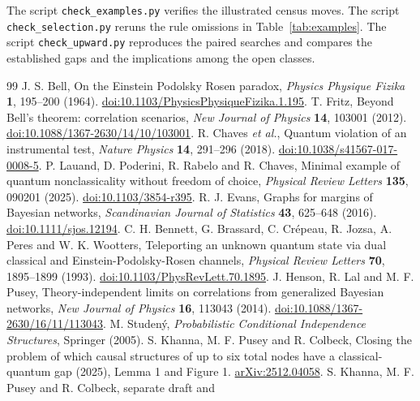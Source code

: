 The script \texttt{check\_examples.py} verifies the illustrated census
moves. The script \texttt{check\_selection.py} reruns the rule omissions in Table~\ref{tab:examples}. The script \texttt{check\_upward.py} reproduces the paired searches
and compares the established gaps and the implications among the open
classes.

\begin{thebibliography}{99}
 J. S. Bell, On the Einstein Podolsky Rosen paradox,
\emph{Physics Physique Fizika} \textbf{1}, 195--200 (1964).
\href{https://doi.org/10.1103/PhysicsPhysiqueFizika.1.195}{doi:10.1103/PhysicsPhysiqueFizika.1.195}.
 T. Fritz, Beyond Bell's theorem: correlation scenarios,
\emph{New Journal of Physics} \textbf{14}, 103001 (2012).
\href{https://doi.org/10.1088/1367-2630/14/10/103001}{doi:10.1088/1367-2630/14/10/103001}.
 R. Chaves \emph{et al.}, Quantum violation of an instrumental
test, \emph{Nature Physics} \textbf{14}, 291--296 (2018).
\href{https://doi.org/10.1038/s41567-017-0008-5}{doi:10.1038/s41567-017-0008-5}.
 P. Lauand, D. Poderini, R. Rabelo and R. Chaves, Minimal
example of quantum nonclassicality without freedom of choice, \emph{Physical
Review Letters} \textbf{135}, 090201 (2025).
\href{https://doi.org/10.1103/3854-r395}{doi:10.1103/3854-r395}.
 R. J. Evans, Graphs for margins of Bayesian networks,
\emph{Scandinavian Journal of Statistics} \textbf{43}, 625--648 (2016).
\href{https://doi.org/10.1111/sjos.12194}{doi:10.1111/sjos.12194}.
 C. H. Bennett, G. Brassard, C. Crépeau, R. Jozsa,
A. Peres and W. K. Wootters, Teleporting an unknown quantum state via dual
classical and Einstein-Podolsky-Rosen channels,
\emph{Physical Review Letters} \textbf{70}, 1895--1899 (1993).
\href{https://doi.org/10.1103/PhysRevLett.70.1895}{doi:10.1103/PhysRevLett.70.1895}.
 J. Henson, R. Lal and M. F. Pusey, Theory-independent limits
on correlations from generalized Bayesian networks,
\emph{New Journal of Physics} \textbf{16}, 113043 (2014).
\href{https://doi.org/10.1088/1367-2630/16/11/113043}{doi:10.1088/1367-2630/16/11/113043}.
 M. Studený, \emph{Probabilistic Conditional Independence
Structures}, Springer (2005).
 S. Khanna, M. F. Pusey and R. Colbeck, Closing the problem of
which causal structures of up to six total nodes have a classical-quantum gap
(2025), Lemma 1 and Figure 1. \href{https://arxiv.org/abs/2512.04058}{arXiv:2512.04058}.
 S. Khanna, M. F. Pusey and R. Colbeck, separate draft and

\end{thebibliography}
